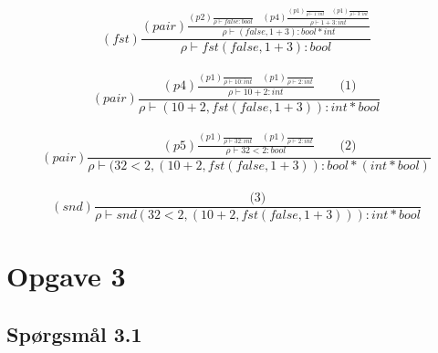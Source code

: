 \documentclass[danish,a4paper]{report}
\begin{document}
\begin{equation}
    (fst)
    \frac{ 
        (pair)
        \frac{
            (p2)
            \frac{
            }
            {
                \rho \vdash false:bool
            } 
            \quad
            (p4)
            \frac{
                (p1)
                \frac{
                }
                {
                    \rho \vdash 1:int
                }
                \quad
                (p1)
                \frac{
                }
                {
                    \rho \vdash 3:int
                }
            }
            {
                \rho \vdash 1+3:int
            }
        }
        {
            \rho \vdash (false,1+3):bool*int
        }
    }
    {
        \rho \vdash fst(false,1+3):bool
    }
\end{equation}\\
\begin{equation}
(pair)
\frac{
    (p4)
    \frac{
        (p1)
        \frac{
        }
        {
            \rho \vdash 10:int
        }
        \quad
        (p1)
        \frac{
        }
        {
            \rho \vdash 2:int
        }
    }
    {
        \rho \vdash 10+2:int
    }
    \quad\quad
    \text{(1)}
}
{
    \rho \vdash (10+2,fst(false,1+3)):int*bool
}
\end{equation}\\
\begin{equation}
(pair)
    \frac{
        (p5)
        \frac{
            (p1)
            \frac{
            }
            {
                \rho \vdash 32:int
            }
            \quad
            (p1)
            \frac{ 
            }
            {
                \rho \vdash 2:int
            }
        }
        {
            \rho \vdash 32<2:bool
        }
        \quad\quad
        \text{(2)}
    }
    {
        \rho \vdash (32<2,(10+2,fst(false,1+3)):bool*(int*bool)
    }
\end{equation}\\
\begin{equation}
(snd)
\frac{
    \text{(3)}
}
{
    \rho \vdash snd(32<2,(10+2,fst(false,1+3))):int*bool
}
\end{equation}

\chapter*{Opgave 3}
\section*{Spørgsmål 3.1}
\end{document}
